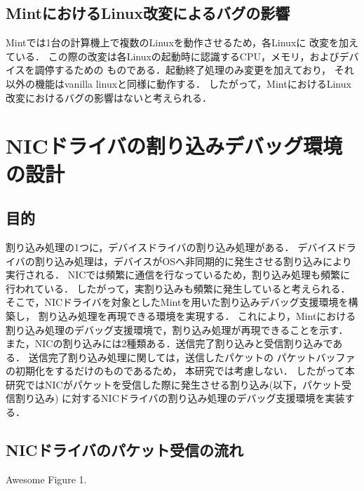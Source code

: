 \documentclass[tanilab-enum]{graduate}
\begin{document}
\section{MintにおけるLinux改変によるバグの影響}
Mintでは1台の計算機上で複数のLinuxを動作させるため，各Linuxに
改変を加えている\cite{kitagawa}．
この際の改変は各Linuxの起動時に認識するCPU，メモリ，およびデバイスを調停するための
ものである．起動終了処理のみ変更を加えており，
それ以外の機能はvanilla linuxと同様に動作する．
したがって，MintにおけるLinux改変におけるバグの影響はないと考えられる．
\chapter{NICドライバの割り込みデバッグ環境の設計}\label{chap:plan}
\section{目的}
割り込み処理の1つに，デバイスドライバの割り込み処理がある．
デバイスドライバの割り込み処理は，デバイスがOSへ非同期的に発生させる割り込みにより
実行される．
NICでは頻繁に通信を行なっているため，割り込み処理も頻繁に行われている．
したがって，実割り込みも頻繁に発生していると考えられる．
そこで，NICドライバを対象としたMintを用いた割り込みデバッグ支援環境を構築し，
割り込み処理を再現できる環境を実現する．
これにより，Mintにおける割り込み処理のデバッグ支援環境で，割り込み処理が再現できることを示す．
また，NICの割り込みには2種類ある．送信完了割り込みと受信割り込みである．
送信完了割り込み処理に関しては，送信したパケットの
パケットバッファの初期化をするだけのものであるため，
本研究では考慮しない．
したがって本研究ではNICがパケットを受信した際に発生させる割り込み(以下，パケット受信割り込み)
に対するNICドライバの割り込み処理のデバッグ支援環境を実装する．
\section{NICドライバのパケット受信の流れ}
{Awesome Figure 1.}
\end{document}
